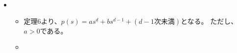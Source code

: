 \begin{myproof}
\begin{itemize}
    \item
      \begin{itemize}
        \item 定理6より、$p(s)= as^d + bs^{d-1} + (d-1次未満)$となる。
        ただし、$a>0$である。
        \item

\end{itemize}
\end{itemize}
\end{myproof}
